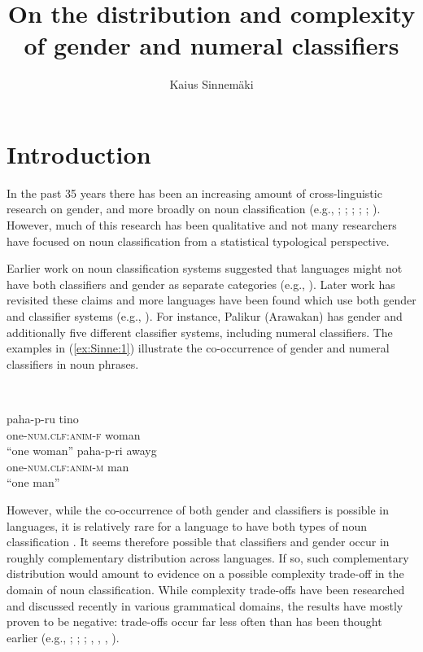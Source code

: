 \documentclass[output=collectionpaper]{langsci/langscibook}
\title{On the distribution and complexity of gender and numeral classifiers}
\author{%
Kaius Sinnemäki
\affiliation{%
University of Helsinki}
}%
\begin{document}
\section{Introduction}

In the past 35 years there has been an increasing amount of cross-linguistic research on gender, and more broadly on noun classification (e.g., \citealt{Dixon1982}; \citealt{Corbett1991}; \citealt{Aikhenvald2000}; \citealt{Audring2009}; \citealt{Kilarski2013}; \citealt{DiGarbo2014}). However, much of this research has been qualitative and not many researchers have focused on noun classification from a statistical typological perspective.

Earlier work on noun classification systems suggested that languages might not have both classifiers and gender as separate categories (e.g., \citealt{Dixon1982}). Later work has revisited these claims and more languages have been found which use both gender and classifier systems (e.g., \citealt{Aikhenvald2000}). For instance, Palikur (Arawakan) has gender and additionally five different classifier systems, including numeral classifiers. The examples in (\ref{ex:Sinne:1}) illustrate the co-occurrence of gender and numeral classifiers in noun phrases.

\ea
\label{ex:Sinne:1}
\\
\begin{xlist}
\ex
\gll paha-p-ru tino\\
one-\textsc{num.clf:anim-f} woman\\
\glt ``one woman''
\ex
\gll paha-p-ri awayg\\
one-\textsc{num.clf:anim-m} man \\
\glt ``one man''\\
\end{xlist}
\z

However, while the co-occurrence of both gender and classifiers is possible in languages, it is relatively rare for a language to have both types of noun classification \citep{Corbett2013}. It seems therefore possible that classifiers and gender occur in roughly complementary distribution across languages. If so, such complementary distribution would amount to evidence on a possible complexity trade-off in the domain of noun classification. While complexity trade-offs have been researched and discussed recently in various grammatical domains, the results have mostly proven to be negative: trade-offs occur far less often than has been thought earlier (e.g., \citealt{Shosted2006}; \citealt{Miestamo2009}; \citealt{Nichols2009}; \citealt{Sinnemaeki2008}, \citealt*{Sinnemaeki2011}, \citealt*{Sinnemaeki2014b}, \citealt*{Sinnemaeki2014a}).
\end{document}
